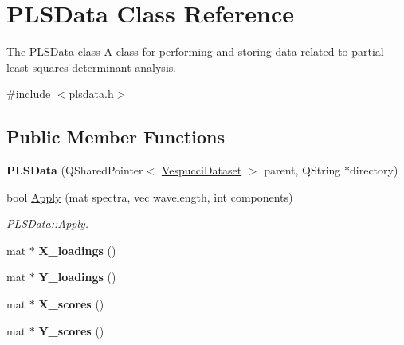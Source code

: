 \hypertarget{class_p_l_s_data}{\section{P\+L\+S\+Data Class Reference}
\label{class_p_l_s_data}
}


The \hyperlink{class_p_l_s_data}{P\+L\+S\+Data} class A class for performing and storing data related to partial least squares determinant analysis.  




{\ttfamily \#include $<$plsdata.\+h$>$}

\subsection*{Public Member Functions}
\begin{DoxyCompactItemize}
\item 
\hypertarget{class_p_l_s_data_ab35feaa574a919c2871ad2c4ec26329e}{{\bfseries P\+L\+S\+Data} (Q\+Shared\+Pointer$<$ \hyperlink{class_vespucci_dataset}{Vespucci\+Dataset} $>$ parent, Q\+String $\ast$directory)}\label{class_p_l_s_data_ab35feaa574a919c2871ad2c4ec26329e}

\item 
bool \hyperlink{class_p_l_s_data_ade79be27d52f0edba28d719d9926453b}{Apply} (mat spectra, vec wavelength, int components)
\begin{DoxyCompactList}\small\item\em \hyperlink{class_p_l_s_data_ade79be27d52f0edba28d719d9926453b}{P\+L\+S\+Data\+::\+Apply}. \end{DoxyCompactList}\item 
\hypertarget{class_p_l_s_data_a87ef81491a831dd54e2e8caee0d0e405}{mat $\ast$ {\bfseries X\+\_\+loadings} ()}\label{class_p_l_s_data_a87ef81491a831dd54e2e8caee0d0e405}

\item 
\hypertarget{class_p_l_s_data_a18918728d424d344471cd300effe97ed}{mat $\ast$ {\bfseries Y\+\_\+loadings} ()}\label{class_p_l_s_data_a18918728d424d344471cd300effe97ed}

\item 
\hypertarget{class_p_l_s_data_a2c680b87fab4edf16491537812662f59}{mat $\ast$ {\bfseries X\+\_\+scores} ()}\label{class_p_l_s_data_a2c680b87fab4edf16491537812662f59}

\item 
\hypertarget{class_p_l_s_data_a5e38d1423170ec72542e6204c59f7e8e}{mat $\ast$ {\bfseries Y\+\_\+scores} ()}\label{class_p_l_s_data_a5e38d1423170ec72542e6204c59f7e8e}


\end{DoxyCompactItemize}
